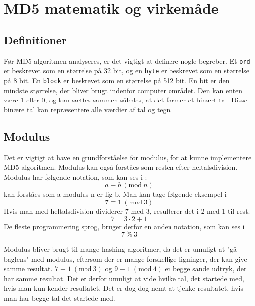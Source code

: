 \documentclass[12pt]{article}
\newcommand{\Mod}[1]{\ (\mathrm{mod}\ #1)}
\begin{document}
\section{MD5 matematik og virkemåde}
\subsection{Definitioner}
Før MD5 algoritmen analyseres, er det vigtigt at definere nogle begreber. Et \verb|ord| er beskrevet som en størrelse på 32 bit, og en \verb|byte| er beskrevet som en størrelse på 8 bit. En \verb|block| er beskrevet som en størrelse på 512 bit. En bit er den mindste størrelse, der bliver brugt indenfor computer området. Den kan enten være 1 eller 0, og kan sættes sammen således, at det former et binært tal. Disse binære tal kan repræsentere alle værdier af tal og tegn. 

\subsection{Modulus}
Det er vigtigt at have en grundforståelse for modulus, for at kunne implementere MD5 algoritmen. Modulus kan også forståes som resten efter heltalsdivision. 
Modulus har følgende notation, som kan ses i \equationautorefname{~\ref{math:modulo-eq}}:
\begin{equation}
a\equiv b \Mod{n}
\label{math:modulo-eq}
\end{equation}
\equationautorefname{~\ref{math:modulo-eq}} kan forståes som a modulus n er lig b. Man kan tage følgende eksempel i \equationautorefname{~\ref{math:modulo-example-1}}
\begin{equation}
7\equiv 1 \Mod{3}
\label{math:modulo-example-1}
\end{equation}
Hvis man med heltalsdivision dividerer 7 med 3, resulterer det i 2 med 1 til rest. 
\begin{equation}
7=3\cdot 2 + 1
\label{math:modulo-example-1-calc}
\end{equation}
De fleste programmering sprog, bruger derfor en anden notation, som kan ses i \equationautorefname{~\ref{math:modulo-example-2}}
\begin{equation}
7 \ \% \ 3
\label{math:modulo-example-2}
\end{equation}

Modulus bliver brugt til mange hashing algoritmer, da det er umuligt at "gå baglens" med modulus, eftersom der er mange forskellige ligninger, der kan give samme resultat. \(7\equiv 1 \Mod{3}\) og \(9\equiv 1 \Mod{4}\) er begge sande udtryk, der har samme resultat. Det er derfor umuligt at vide hvilke tal, det startede med, hvis man kun kender resultatet. Det er dog dog nemt at tjekke resultatet, hvis man har begge tal det startede med. 
\end{document}
